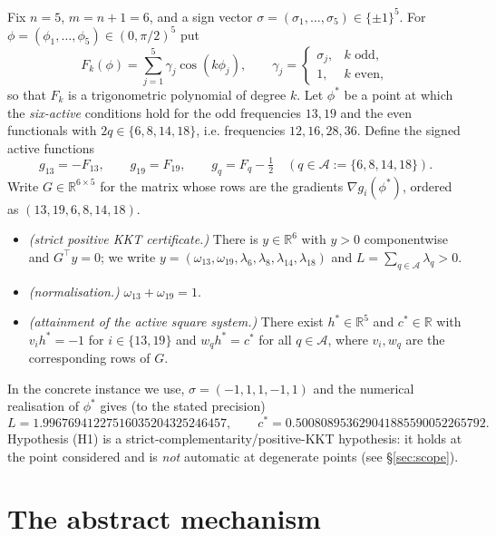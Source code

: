 \documentclass[11pt]{article}
\theoremstyle{definition}
\newcommand{\R}{\mathbb{R}}
\begin{document}
Fix $n=5$, $m=n+1=6$, and a sign vector $\sigma=(\sigma_1,\dots,\sigma_5)\in\{\pm1\}^5$. For
$\phi=(\phi_1,\dots,\phi_5)\in(0,\pi/2)^5$ put
\begin{equation}\label{eq:F}
F_k(\phi)=\sum_{j=1}^{5}\gamma_j\cos(k\phi_j),\qquad
\gamma_j=\begin{cases}\sigma_j,& k \text{ odd},\\ 1,& k \text{ even},\end{cases}
\end{equation}
so that $F_k$ is a trigonometric polynomial of degree $k$. Let $\phi^\ast$ be a point at which the
\emph{six-active} conditions hold for the odd frequencies $13,19$ and the even functionals with
$2q\in\{6,8,14,18\}$, i.e. frequencies $12,16,28,36$. Define the signed active functions
\begin{equation}\label{eq:g}
g_{13}=-F_{13},\qquad g_{19}=F_{19},\qquad g_{q}=F_{q}-\tfrac12\quad(q\in\mathcal A:=\{6,8,14,18\}).
\end{equation}
Write $G\in\R^{6\times5}$ for the matrix whose rows are the gradients $\nabla g_i(\phi^\ast)$, ordered
as $(13,19,6,8,14,18)$.

\begin{itemize}
\item[\textbf{(H1)}] \emph{(strict positive KKT certificate.)} There is $y\in\R^{6}$ with $y>0$
componentwise and $G^{\top}y=0$; we write $y=(\omega_{13},\omega_{19},\lambda_6,\lambda_8,\lambda_{14},\lambda_{18})$
and $L=\sum_{q\in\mathcal A}\lambda_q>0$.
\item[\textbf{(H2)}] \emph{(normalisation.)} $\omega_{13}+\omega_{19}=1$.
\item[\textbf{(H3)}] \emph{(attainment of the active square system.)} There exist $h^\ast\in\R^5$ and
$c^\ast\in\R$ with $v_ih^\ast=-1$ for $i\in\{13,19\}$ and $w_qh^\ast=c^\ast$ for all $q\in\mathcal A$,
where $v_i,w_q$ are the corresponding rows of $G$.
\end{itemize}

\medskip
\noindent
In the concrete instance we use, $\sigma=(-1,1,1,-1,1)$ and the numerical realisation of
$\phi^\ast$ gives (to the stated precision)
\[
L=1.99676941227516035204325246457,\qquad
c^\ast=0.500808953629041885590052265792 .
\]
Hypothesis (H1) is a strict-complementarity/positive-KKT hypothesis: it holds at the point
considered and is \emph{not} automatic at degenerate points (see \S\ref{sec:scope}).

\section{The abstract mechanism}\label{sec:mechanism}
\end{document}
